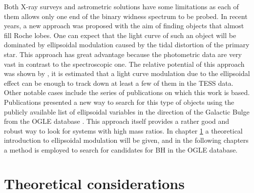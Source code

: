 \documentclass{pracalicmgr}
\begin{document}
Both X-ray surveys and astrometric solutions have some limitations as each of them allows only one end of the binary widness spectrum to be probed.
In recent years, a new approach was proposed with the aim of finding objects that almost fill Roche lobes. One can expect that the light curve of such an object
will be dominated by ellipsoidal modulation caused by the tidal distortion of the primary star. This approach has great advantage because the photometric
data are very vast in contrast to the spectroscopic one.
The relative potential of this approach was shown by \citet{masuda_prospects_2019}, it is estimated that a light curve modulation due to the ellipsoidal effect can be enough to track down
at least a few of them in the TESS data. Other notable cases include the series of publications \citet{gomel_search_2021-1,gomel_search_2021-2,gomel_search_2021-3} on which this work is based.
Publications presented a new way to search for this type of objects using the publicly available list of ellipsoidal variables in the direction of the Galactic Bulge from the OGLE database \citep{soszynski_ogle_2016}. This approach itself provides a rather good and robust way to look for systems with high mass ratios. In chapter \ref{theo} a theoretical
introduction to ellipsoidal modulation will be given, and in the following chapters a method is employed to search for candidates for BH in the OGLE database.

\chapter{Theoretical considerations}\label{theo}
\end{document}
